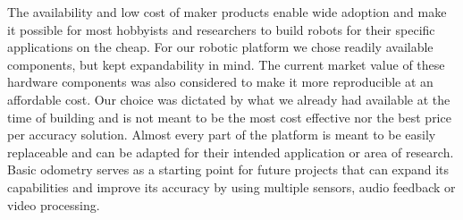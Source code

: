 The availability and low cost of maker products enable wide adoption and make it possible for most hobbyists and 
researchers to build robots for their specific applications on the cheap.
For our robotic platform we chose readily available components, but kept expandability in mind. The current market 
value of these hardware components was also considered to make it more reproducible at an affordable cost. Our choice 
was dictated by what we already had available at the time of building and is not meant to be the most cost effective 
nor the best price per accuracy solution. Almost every part of the platform is meant to be easily replaceable and can 
be adapted for their intended application or area of research.
Basic odometry serves as a starting point for future projects that can expand its capabilities and improve its accuracy 
by using multiple sensors, audio feedback or video processing.
